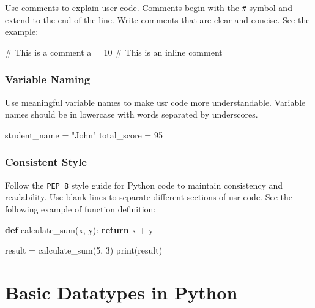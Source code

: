 \documentclass[
  letterpaper,
  DIV=11,
  numbers=noendperiod]{scrreprt}
\newenvironment{Shaded}{\begin{snugshade}}{\end{snugshade}}
\newcommand{\BuiltInTok}[1]{\textcolor[rgb]{0.00,0.23,0.31}{#1}}
\newcommand{\CommentTok}[1]{\textcolor[rgb]{0.37,0.37,0.37}{#1}}
\newcommand{\ControlFlowTok}[1]{\textcolor[rgb]{0.00,0.23,0.31}{\textbf{#1}}}
\newcommand{\DecValTok}[1]{\textcolor[rgb]{0.68,0.00,0.00}{#1}}
\newcommand{\KeywordTok}[1]{\textcolor[rgb]{0.00,0.23,0.31}{\textbf{#1}}}
\newcommand{\NormalTok}[1]{\textcolor[rgb]{0.00,0.23,0.31}{#1}}
\newcommand{\OperatorTok}[1]{\textcolor[rgb]{0.37,0.37,0.37}{#1}}
\newcommand{\StringTok}[1]{\textcolor[rgb]{0.13,0.47,0.30}{#1}}
\theoremstyle{plain}
\theoremstyle{definition}
\theoremstyle{remark}
\begin{document}
Use comments to explain user code. Comments begin with the \texttt{\#}
symbol and extend to the end of the line. Write comments that are clear
and concise. See the example:

\begin{Shaded}
\begin{Highlighting}[]
\CommentTok{\# This is a comment}
\NormalTok{a }\OperatorTok{=} \DecValTok{10}  \CommentTok{\# This is an inline comment}
\end{Highlighting}
\end{Shaded}

\subsubsection{Variable Naming}\label{variable-naming}

Use meaningful variable names to make usr code more understandable.
Variable names should be in lowercase with words separated by
underscores.

\begin{Shaded}
\begin{Highlighting}[]
\NormalTok{student\_name }\OperatorTok{=} \StringTok{"John"}
\NormalTok{total\_score }\OperatorTok{=} \DecValTok{95}
\end{Highlighting}
\end{Shaded}

\subsubsection{Consistent Style}\label{consistent-style}

Follow the \texttt{PEP\ 8} style guide for Python code to maintain
consistency and readability. Use blank lines to separate different
sections of usr code. See the following example of function definition:

\begin{Shaded}
\begin{Highlighting}[]

\KeywordTok{def}\NormalTok{ calculate\_sum(x, y):}
    \ControlFlowTok{return}\NormalTok{ x }\OperatorTok{+}\NormalTok{ y}

\NormalTok{result }\OperatorTok{=}\NormalTok{ calculate\_sum(}\DecValTok{5}\NormalTok{, }\DecValTok{3}\NormalTok{)}
\BuiltInTok{print}\NormalTok{(result)}
\end{Highlighting}
\end{Shaded}

\section{Basic Datatypes in Python}\label{basic-datatypes-in-python}
\end{document}
